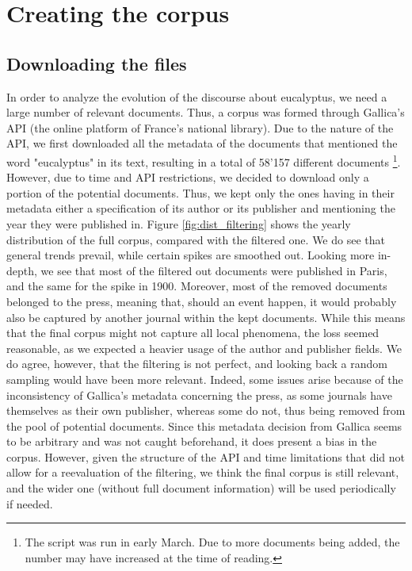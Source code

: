 \section{Creating the corpus}
\subsection{Downloading the files}
\label{sec:met_files}

In order to analyze the evolution of the discourse about eucalyptus, we need a large number of relevant documents. Thus, a corpus was formed through Gallica's API (the online platform of France's national library). Due to the nature of the API, we first downloaded all the metadata of the documents that mentioned the word "eucalyptus" in its text, resulting in a total of 58'157 different documents \footnote{The script was run in early March. Due to more documents being added, the number may have increased at the time of reading.}. However, due to time and API restrictions, we decided to download only a portion of the potential documents. Thus, we kept only the ones having in their metadata either a specification of its author or its publisher and mentioning the year they were published in. Figure \ref{fig:dist_filtering} shows the yearly distribution of the full corpus, compared with the filtered one. We do see that general trends prevail, while certain spikes are smoothed out. Looking more in-depth, we see that most of the filtered out documents were published in Paris, and the same for the spike in 1900. Moreover, most of the removed documents belonged to the press, meaning that, should an event happen, it would probably also be captured by another journal within the kept documents. While this means that the final corpus might not capture all local phenomena, the loss seemed reasonable, as we expected a heavier usage of the author and publisher fields. We do agree, however, that the filtering is not perfect, and looking back a random sampling would have been more relevant. Indeed, some issues arise because of the inconsistency of Gallica's metadata concerning the press, as some journals have themselves as their own publisher, whereas some do not, thus being removed from the pool of potential documents. Since this metadata decision from Gallica seems to be arbitrary and was not caught beforehand, it does present a bias in the corpus. However, given the structure of the API and time limitations that did not allow for a reevaluation of the filtering, we think the final corpus is still relevant, and the wider one (without full document information) will be used periodically if needed. 

